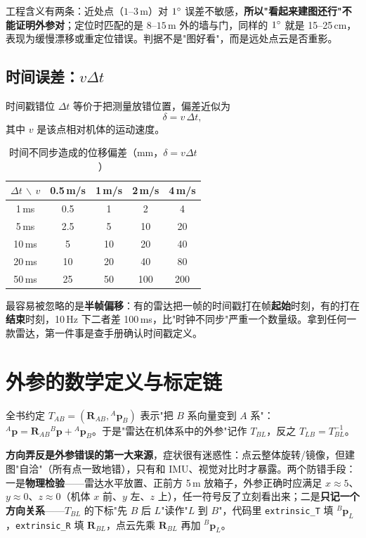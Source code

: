 工程含义有两条：近处点（$1$--$3$\,m）对 $1^\circ$ 误差不敏感，\textbf{所以"看起来建图还行"不能证明外参对}；定位时匹配的是 $8$--$15$\,m 外的墙与门，同样的 $1^\circ$ 就是 15--25\,cm，表现为缓慢漂移或重定位错误。判据不是"图好看"，而是远处点云是否重影。

\subsection{时间误差：$v\Delta t$}

时间戳错位 $\Delta t$ 等价于把测量放错位置，偏差近似为
\begin{equation}
\delta=v\,\Delta t,
\label{eq:26-timedelay}
\end{equation}
其中 $v$ 是该点相对机体的运动速度。

\begin{table}[htbp]
  \centering
  \caption{时间不同步造成的位移偏差（mm，$\delta=v\Delta t$）}\label{tab:26-time}
  \small
  \begin{tabular}{ccccc}
    \toprule
    $\Delta t$ $\backslash$ $v$ & 0.5\,m/s & 1\,m/s & 2\,m/s & 4\,m/s \\
    \midrule
    1\,ms  & 0.5 & 1 & 2 & 4 \\
    5\,ms  & 2.5 & 5 & 10 & 20 \\
    10\,ms & 5 & 10 & 20 & 40 \\
    20\,ms & 10 & 20 & 40 & 80 \\
    50\,ms & 25 & 50 & 100 & 200 \\
    \bottomrule
  \end{tabular}
\end{table}

最容易被忽略的是\textbf{半帧偏移}：有的雷达把一帧的时间戳打在帧\textbf{起始}时刻，有的打在\textbf{结束}时刻，10\,Hz 下二者差 100\,ms，比"时钟不同步"严重一个数量级。拿到任何一款雷达，第一件事是查手册确认时间戳定义。

\section{外参的数学定义与标定链}\label{sec:26-extrinsic}

全书约定 $T_{AB}=(\bm{R}_{AB},{}^{A}\bm{p}_{B})$ 表示"把 $B$ 系向量变到 $A$ 系"：${}^{A}\bm{p}=\bm{R}_{AB}{}^{B}\bm{p}+{}^{A}\bm{p}_{B}$。于是"雷达在机体系中的外参"记作 $T_{BL}$，反之 $T_{LB}=T_{BL}^{-1}$。

\textbf{方向弄反是外参错误的第一大来源}，症状很有迷惑性：点云整体旋转/镜像，但建图"自洽"（所有点一致地错），只有和 IMU、视觉对比时才暴露。两个防错手段：一是\textbf{物理检验}——雷达水平放置、正前方 5\,m 放箱子，外参正确时应满足 $x\approx5$、$y\approx0$、$z\approx0$（机体 $x$ 前、$y$ 左、$z$ 上），任一符号反了立刻看出来；二是\textbf{只记一个方向关系}——$T_{BL}$ 的下标"先 $B$ 后 $L$"读作"$L$ 到 $B$"，代码里 \lstinline{extrinsic_T} 填 ${}^{B}\bm{p}_{L}$，\lstinline{extrinsic_R} 填 $\bm{R}_{BL}$，点云先乘 $\bm{R}_{BL}$ 再加 ${}^{B}\bm{p}_{L}$。

